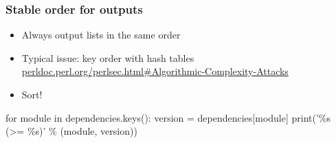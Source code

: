\documentclass[14pt,aspectratio=169]{beamer}
\begin{document}
\begin{frame}[plain]
\end{frame}

\begin{frame}[fragile]
 \frametitle{Stable order for outputs}

 \begin{itemize}
  \item Always output lists in the same order
  \item Typical issue: key order with hash tables\\
    {\small \url{perldoc.perl.org/perlsec.html#Algorithmic-Complexity-Attacks}}
  \item<2> Sort!
 \end{itemize}

 \begin{example}
\begin{semiverbatim}
for module in dependencies.keys():
    version = dependencies[module]
    print('\%s (>= \%s)' \% (module, version))
\end{semiverbatim}
 \end{example}
\end{frame}
\end{document}
